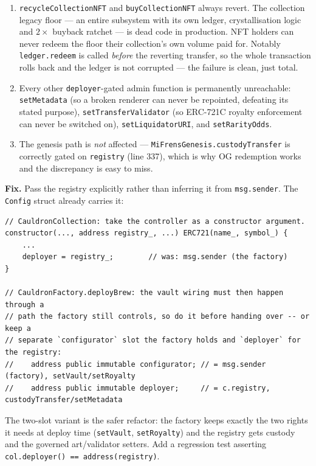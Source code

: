 \documentclass[10pt,a4paper]{article}
\newcommand{\code}[1]{\texttt{\small #1}}
\begin{document}
\begin{enumerate}
\item \code{recycleCollectionNFT} and \code{buyCollectionNFT} always revert.
The collection legacy floor --- an entire subsystem with its own ledger,
crystallisation logic and $2\times$ buyback ratchet --- is dead code in
production. NFT holders can never redeem the floor their collection's own
volume paid for. Notably \code{ledger.redeem} is called \emph{before} the
reverting transfer, so the whole transaction rolls back and the ledger is not
corrupted --- the failure is clean, just total.
\item Every other \code{deployer}-gated admin function is permanently
unreachable: \code{setMetadata} (so a broken renderer can never be repointed,
defeating its stated purpose), \code{setTransferValidator} (so ERC-721C royalty
enforcement can never be switched on), \code{setLiquidatorURI}, and
\code{setRarityOdds}.
\item The genesis path is \emph{not} affected --- \code{MiFrensGenesis.custodyTransfer}
is correctly gated on \code{registry} (line 337), which is why OG redemption
works and the discrepancy is easy to miss.
\end{enumerate}

\textbf{Fix.} Pass the registry explicitly rather than inferring it from
\code{msg.sender}. The \code{Config} struct already carries it:

\begin{lstlisting}[numbers=none]
// CauldronCollection: take the controller as a constructor argument.
constructor(..., address registry_, ...) ERC721(name_, symbol_) {
    ...
    deployer = registry_;        // was: msg.sender (the factory)
}

// CauldronFactory.deployBrew: the vault wiring must then happen through a
// path the factory still controls, so do it before handing over -- or keep a
// separate `configurator` slot the factory holds and `deployer` for the registry:
//    address public immutable configurator; // = msg.sender (factory), setVault/setRoyalty
//    address public immutable deployer;     // = c.registry,  custodyTransfer/setMetadata
\end{lstlisting}

\noindent The two-slot variant is the safer refactor: the factory keeps exactly
the two rights it needs at deploy time (\code{setVault}, \code{setRoyalty}) and
the registry gets custody and the governed art/validator setters. Add a
regression test asserting \code{col.deployer() == address(registry)}.
\end{document}
